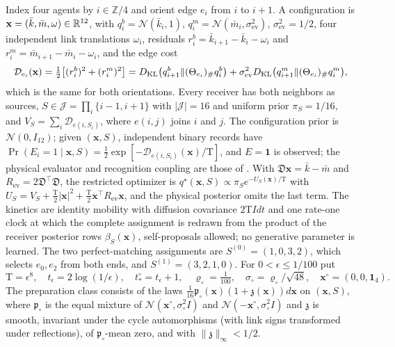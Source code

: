 Index four agents by \(i\in\mathbb Z/4\) and orient edge \(e_i\) from \(i\) to
\(i+1\). A configuration is \(\mathbf x=(\bar k,\bar m,\omega)\in\mathbb R^{12}\), with
\(q_i^b=\mathcal N(\bar k_i,1)\), \(q_i^m=\mathcal N(\bar m_i,\sigma^2_{\mathrm{ev}})\),
\(\sigma^2_{\mathrm{ev}}=1/2\), four independent link translations
\(\omega_i\), residuals \(r^b_i=\bar k_{i+1}-\bar k_i-\omega_i\) and
\(r^m_i=\bar m_{i+1}-\bar m_i-\omega_i\), and the edge cost
\begin{equation}
\mathcal D_{e_i}(\mathbf x)=\tfrac12\bigl[(r^b_i)^2+(r^m_i)^2\bigr]
=D_{\mathrm{KL}}\bigl(q^b_{i+1}\Vert(\Theta_{e_i})_\#q^b_i\bigr)
+\sigma^2_{\mathrm{ev}}D_{\mathrm{KL}}\bigl(q^m_{i+1}\Vert(\Theta_{e_i})_\#q^m_i\bigr),
\label{eq:rg-formation-cycle-cost}
\end{equation}
which is the same for both orientations. Every receiver has both neighbors as
sources, \(S\in\mathcal J=\prod_i\{i-1,i+1\}\) with \(|\mathcal J|=16\) and
uniform prior \(\pi_S=1/16\), and \(V_S=\sum_i\mathcal D_{e(i,S_i)}\), where
\(e(i,j)\) joins \(i\) and \(j\). The configuration prior is
\(\mathcal N(0,I_{12})\); given \((\mathbf x,S)\), independent binary records
have \(\Pr(E_i=1\mid\mathbf x,S)=\tfrac12\exp[-\mathcal D_{e(i,S_i)}(\mathbf x)/\mathrm T]\),
and \(E=\mathbf 1\) is observed; the physical evaluator and recognition
coupling are those of . With
\(\mathfrak D\mathbf x=\bar k-\bar m\) and
\(R_{\mathrm{ev}}=2\mathfrak D^\top\mathfrak D\), the restricted optimizer is
\(q^\star(\mathbf x,S)\propto\pi_Se^{-U_S(\mathbf x)/\mathrm T}\) with
\(U_S=V_S+\tfrac{\mathrm T}2|\mathbf x|^2+\tfrac{\mathrm T}2\mathbf x^\top R_{\mathrm{ev}}\mathbf x\),
and the physical posterior omits the last term. The kinetics are identity
mobility with diffusion covariance \(2\mathrm TI dt\) and one rate-one clock
at which the complete assignment is redrawn from the product of the receiver
posterior rows \(\beta_S(\mathbf x)\), self-proposals allowed; no generative
parameter is learned. The two perfect-matching assignments are
\(S^{(0)}=(1,0,3,2)\), which selects \(e_0,e_2\) from both ends, and
\(S^{(1)}=(3,2,1,0)\). For \(0<\epsilon\le1/100\) put
\begin{equation}
\mathrm T=\epsilon^8,\quad t_\epsilon=2\log(1/\epsilon),\quad
t^\circ_*=t_\epsilon+1,\quad \varrho_\circ=\tfrac1{100},\quad
\sigma_\circ=\varrho_\circ/\sqrt{48},\quad \mathbf x^\circ=(0,0,\mathbf 1_4).
\label{eq:rg-formation-cycle-regime}
\end{equation}
The preparation class consists of the laws
\(\frac1{16}\mathfrak p_\circ(\mathbf x)(1+\mathfrak z(\mathbf x)) d\mathbf x\)
on \((\mathbf x,S)\), where \(\mathfrak p_\circ\) is the equal mixture of
\(\mathcal N(\mathbf x^\circ,\sigma_\circ^2I)\) and
\(\mathcal N(-\mathbf x^\circ,\sigma_\circ^2I)\) and \(\mathfrak z\) is smooth,
invariant under the cycle automorphisms (with link signs transformed under
reflections), of \(\mathfrak p_\circ\)-mean zero, and with
\(\|\mathfrak z\|_\infty<1/2\).

